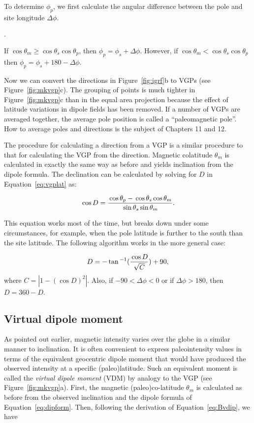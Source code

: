 To determine $\phi_p$, we first calculate the angular difference between
the pole and site
longitude $\Delta \phi$.  
 
  .
\label{eq:vgplong}
\eeq
 
\noindent  If $\cos \theta_m
\geq \cos \theta_s \cos \theta_p$, then $\phi_p = \phi_s+\Delta \phi$.
However, if $\cos \theta_m <
\cos \theta_s \cos \theta_p$ then
$\phi_p=\phi_s + 180 -\Delta \phi$.


Now we can convert the directions in
Figure~\ref{fig:igrf}b to 
%
VGPs (see Figure~\ref{fig:mkvgp}c).  The grouping 
of points is much tighter in Figure~\ref{fig:mkvgp}c than in the
equal area projection because the effect
of latitude variations in dipole fields has been removed.    
If a number of VGPs are averaged together, the average pole position is called a ``paleomagnetic pole''.  How to average poles and directions is the subject of Chapters 11 and 12.

The procedure for calculating a direction from a VGP is a similar procedure to that for calculating the VGP from the direction.    
Magnetic colatitude $\theta_m$ is calculated in exactly the same way as before and yields inclination from the dipole formula.   The declination can be calculated  by solving for $D$ in Equation~\ref{eq:vgplat} as:

$$
\cos D = { { \cos \theta_p - \cos \theta_s \cos \theta_m} \over { \sin \theta_s \sin \theta_m} }.
$$

\noindent
This equation works most of the time, but breaks down under some circumstances, for example, when the pole latitude is further to the south than the site latitude.   The following algorithm works in the more general case:



$$
D= - \tan^{-1} (  { { \cos D}\over { \sqrt{ C}  } }) + 90,
$$
\noindent where $C = |1- (\cos D)^2|$.     Also, if  $-90 < \Delta \phi <0$ or if $ \Delta \phi > 180$, then $D = 360 - D$.       
 
%
\subsection {Virtual dipole moment}
\label{sect:vdm}

As pointed out earlier,  magnetic
intensity varies
 over the globe in a similar manner to inclination.   It is 
 often convenient to express
paleointensity values in terms of the equivalent geocentric dipole
moment
that would have produced the observed intensity at a specific  (paleo)latitude.
Such an equivalent  moment is called the {\it virtual dipole moment} (VDM) by
analogy to the VGP (see Figure~\ref{fig:mkvgp}a).  First, the magnetic
(paleo)co-latitude $\theta_m $ is calculated as before from the observed
inclination
and the dipole formula of Equation~\ref{eq:dipform}. Then, following the
derivation of Equation~\ref{eq:Bvdip}, we have

